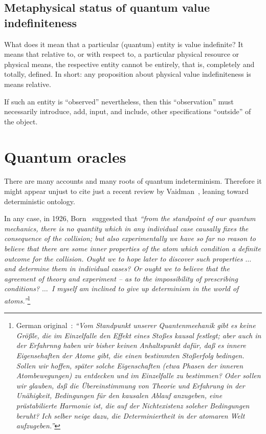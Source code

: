 \section{Metaphysical status of quantum value indefiniteness}
\label{2016-pu-book-chapter-qm} %




What does it mean that a particular (quantum) entity is value indefinite?
It means that relative to, or with respect to, a particular physical resource or physical means,
the respective entity cannot be entirely, that is, completely and totally, defined.
In short: any proposition about physical value indefiniteness is means relative.

If such an entity is ``observed'' nevertheless, then this ``observation''
must necessarily introduce, add, input, and include, other specifications ``outside'' of the object.


\chapter{Quantum oracles}
\label{2016-pu-book-chapter-qo} %

There are many accounts and many roots of quantum indeterminism.
Therefore it might appear unjust to cite just a recent review by Vaidman~\cite{Vaidman2014}, leaning toward deterministic ontology.

In any case, in 1926, Born~\cite[p.~54]{wheeler-Zurek:83}  suggested that
{\em ``from the standpoint of our quantum mechanics, there is no quantity
which in any individual case causally fixes the consequence of the collision;
but also experimentally we have so far no reason to believe that there are some inner properties of the atom
which condition a definite outcome for the collision.
Ought we to hope later to discover such properties $\ldots$  and determine them in individual cases?
Or ought we to  believe that the agreement of theory and experiment  --  as to the impossibility
of prescribing conditions? $\ldots$~I myself am inclined  to give up determinism in the world of atoms.''}\footnote{
German original~\cite[p.~866]{born-26-1}: {\em ``Vom
Standpunkt unserer Quantenmeehanik gibt es keine Gr\"o{\ss}le, die im Einzelfalle
den Effekt eines Sto{\ss}es kausal festlegt; aber auch in der Erfahrnng
haben wir bisher keinen Anhaltspunkt daf\"ur, da{\ss} es innere Eigensehaften
der Atome gibt, die einen bestimmten Sto{\ss}erfolg bedingen. Sollen wir
hoffen, sp\"ater solche Eigenschaften (etwa Phasen der inneren Atombewegungen)
zu entdecken und im Einzelfalle zu bestimmen? Oder sollen
wir glauben, ds{\ss} die \"Ubereinstimmung von Theorie und Erfahrung in der
Un\"ahigkeit, Bedingungen f\"ur den kausalen Ablauf anzugeben, eine pr\"astabilierte
Harmonie ist, die auf der Nichtexistenz soleher Bedingungen
beruht? Ich selber neige dazu, die Determiniertheit in der atomaren
Welt aufzugeben.''}
}

